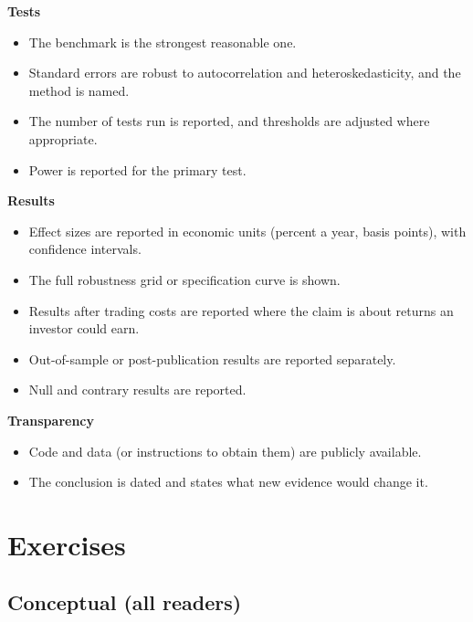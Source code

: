 \textbf{Tests}

\begin{itemize}
  \item[$\square$] The benchmark is the strongest reasonable one.
  \item[$\square$] Standard errors are robust to autocorrelation and heteroskedasticity, and the method is named.
  \item[$\square$] The number of tests run is reported, and thresholds are adjusted where appropriate.
  \item[$\square$] Power is reported for the primary test.
\end{itemize}

\textbf{Results}

\begin{itemize}
  \item[$\square$] Effect sizes are reported in economic units (percent a year, basis points), with confidence intervals.
  \item[$\square$] The full robustness grid or specification curve is shown.
  \item[$\square$] Results after trading costs are reported where the claim is about returns an investor could earn.
  \item[$\square$] Out-of-sample or post-publication results are reported separately.
  \item[$\square$] Null and contrary results are reported.
\end{itemize}

\textbf{Transparency}

\begin{itemize}
  \item[$\square$] Code and data (or instructions to obtain them) are publicly available.
  \item[$\square$] The conclusion is dated and states what new evidence would change it.
\end{itemize}

\section*{Exercises}

\subsection*{Conceptual (all readers)}

